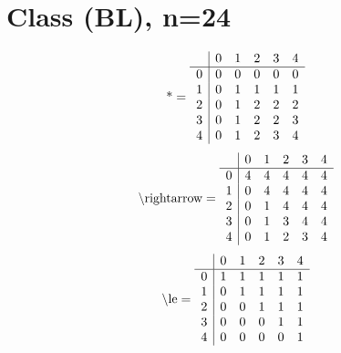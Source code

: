 \documentclass[11pt]{article}
\begin{document}
\section{Class (BL), n=24}
\[\text{*} = 
\begin{array}{r | r r r r r}
 & 0 & 1 & 2 & 3 & 4 \\ \hline
0 & 0 & 0 & 0 & 0 & 0 \\
1 & 0 & 1 & 1 & 1 & 1 \\
2 & 0 & 1 & 2 & 2 & 2 \\
3 & 0 & 1 & 2 & 2 & 3 \\
4 & 0 & 1 & 2 & 3 & 4 \\
\end{array}
\]
\[\text{\textbackslash rightarrow} = 
\begin{array}{r | r r r r r}
 & 0 & 1 & 2 & 3 & 4 \\ \hline
0 & 4 & 4 & 4 & 4 & 4 \\
1 & 0 & 4 & 4 & 4 & 4 \\
2 & 0 & 1 & 4 & 4 & 4 \\
3 & 0 & 1 & 3 & 4 & 4 \\
4 & 0 & 1 & 2 & 3 & 4 \\
\end{array}
\]
\[\text{\textbackslash le} = 
\begin{array}{r | r r r r r}
 & 0 & 1 & 2 & 3 & 4 \\ \hline
0 & 1 & 1 & 1 & 1 & 1 \\
1 & 0 & 1 & 1 & 1 & 1 \\
2 & 0 & 0 & 1 & 1 & 1 \\
3 & 0 & 0 & 0 & 1 & 1 \\
4 & 0 & 0 & 0 & 0 & 1 \\
\end{array}
\]
\end{document}
